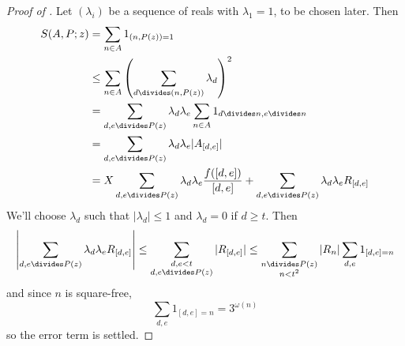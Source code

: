 \documentclass[a4paper]{article}
\theoremstyle{definition}
\begin{document}
\begin{proof}[Proof of ]
  Let \((\lambda_i)\) be a sequence of reals with \(\lambda_1 = 1\), to be chosen later. Then
  \begin{align*}
    S(A, P; z)
    &= \sum_{n \in A} 1_{(n, P(z)) = 1} \\
    &\leq \sum_{n \in A} \left( \sum_{d \divides (n, P(z))} \lambda_d \right)^2 \\
    &= \sum_{d, e \divides P(z)} \lambda_d \lambda_e \sum_{n \in A} 1_{d \divides n, e \divides n} \\
    &= \sum_{d, e \divides P(z)} \lambda_d \lambda_e |A_{[d, e]}| \\
    &= X \sum_{d, e \divides P(z)} \lambda_d \lambda_e \frac{f([d, e])}{[d, e]} + \sum_{d, e \divides P(z)} \lambda_d \lambda_e R_{[d, e]}
  \end{align*}
  We'll choose \(\lambda_d\) such that \(|\lambda_d| \leq 1\) and \(\lambda_d = 0\) if \(d \geq t\). Then
  \[
    \left| \sum_{d, e \divides P(z)} \lambda_d \lambda_e R_{[d, e]} \right|
    \leq \sum_{\substack{d, e < t \\ d, e \divides P(z)}} |R_{[d, e]}|
    \leq \sum_{\substack{n \divides P(z) \\ n < t^2}} |R_n| \sum_{d, e} 1_{[d, e] = n}
  \]
  and since \(n\) is square-free,
  \[
    \sum_{d, e} 1_{[d, e] = n} = 3^{\omega(n)}
  \]
  so the error term is settled.


\end{proof}
\end{document}
